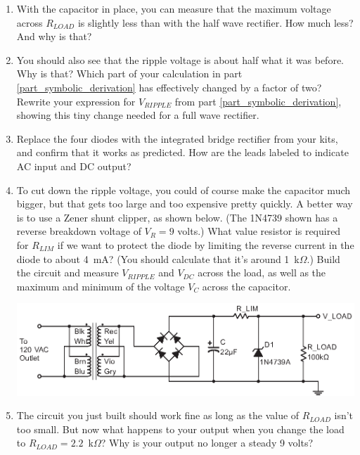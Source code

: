 \begin{enumerate}[wide]
\item With the capacitor in place, you can measure that the maximum voltage across $R_{LOAD}$ is slightly less than with the half wave rectifier.  How much less?  And why is that?

\item You should also see that the ripple voltage is about half what it was before.  Why is that?  Which part of your calculation in part \ref{part_symbolic_derivation} has effectively changed by a factor of two?  Rewrite your expression for $V_{RIPPLE}$ from part \ref{part_symbolic_derivation}, showing this tiny change needed for a full wave rectifier.  \label{part_symbolic_derivation_2f}

\item Replace the four diodes with the integrated bridge rectifier from your kits, and confirm that it works as predicted.  How are the leads labeled to indicate AC input and DC output?

\item To cut down the ripple voltage, you could of course make the capacitor much bigger, but that gets too large and too expensive pretty quickly.  A better way is to use a Zener shunt clipper, as shown below.  (The 1N4739 shown has a reverse breakdown voltage of $V_R=9$ volts.)  What value resistor is required for $R_{LIM}$ if we want to protect the diode by limiting the reverse current in the diode to about 4~mA?  (You should calculate that it's around 1~k$\Omega$.) Build the circuit and measure $V_{RIPPLE}$ and $V_{DC}$ across the load, as well as the maximum and minimum of the voltage $V_C$ across the capacitor.  \label{part_zener_regulator}
\begin{center}
\includegraphics{power_supply/zener_regulator.eps}
\end{center}

\item The circuit you just built should work fine as long as the value of $R_{LOAD}$ isn't too small.  But now what happens to your output when you change the load to $R_{LOAD} = 2.2$~k$\Omega$?  Why is your output no longer a steady 9 volts?


\end{enumerate}
